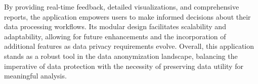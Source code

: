\documentclass{article}
\begin{document}
By providing real-time feedback, detailed visualizations, and comprehensive reports, the application empowers users to make informed decisions about their data processing workflows. Its modular design facilitates scalability and adaptability, allowing for future enhancements and the incorporation of additional features as data privacy requirements evolve. Overall, this application stands as a robust tool in the data anonymization landscape, balancing the imperative of data protection with the necessity of preserving data utility for meaningful analysis.
\end{document}
